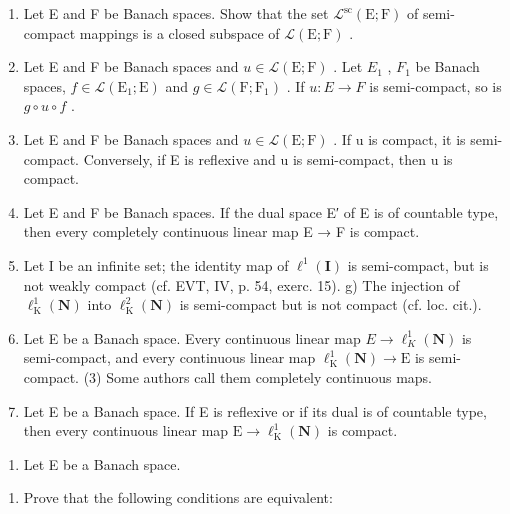 \begin{enumerate}
\def\labelenumi{\alph{enumi})}
\setcounter{enumi}{1}
\item
  Let E and F be Banach spaces. Show that the set \(\mathcal{L}^{\mathrm{sc}}(\mathrm{E};\mathrm{F})\) of semi-compact mappings is a closed subspace of \(\mathcal{L}(\mathrm{E};\mathrm{F})\) .
\item
  Let E and F be Banach spaces and \(u \in \mathcal{L}(\mathrm{E};\mathrm{F})\) . Let \(E_{1}\) , \(F_{1}\) be Banach spaces, \(f \in \mathcal{L}(\mathrm{E}_{1};\mathrm{E})\) and \(g \in \mathcal{L}(\mathrm{F};\mathrm{F}_{1})\) . If \(u: E \to F\) is semi-compact, so is \(g \circ u \circ f\) .
\item
  Let E and F be Banach spaces and \(u \in \mathcal{L}(\mathrm{E};\mathrm{F})\) . If u is compact, it is semi-compact. Conversely, if E is reflexive and u is semi-compact, then u is compact.
\item
  Let E and F be Banach spaces. If the dual space E′ of E is of countable type, then every completely continuous linear map E → F is compact.
\item
  Let I be an infinite set; the identity map of \(\ell^{1}(\mathbf{I})\) is semi-compact, but is not weakly compact (cf. EVT, IV, p. 54, exerc. 15). g) The injection of \(\ell_{\mathrm{K}}^{1}(\mathbf{N})\) into \(\ell_{\mathrm{K}}^{2}(\mathbf{N})\) is semi-compact but is not compact (cf. loc. cit.).
\item
  Let E be a Banach space. Every continuous linear map \(E \rightarrow \ell_{K}^{1}(\mathbf{N})\) is semi-compact, and every continuous linear map \(\ell_{\mathrm{K}}^{1}(\mathbf{N}) \rightarrow \mathrm{E}\) is semi-compact.
(3) Some authors call them completely continuous maps.
\item
  Let E be a Banach space. If E is reflexive or if its dual is of countable type, then every continuous linear map \(\mathrm{E} \to \ell_{\mathrm{K}}^{1}(\mathbf{N})\) is compact.
\end{enumerate}

\begin{enumerate}
\def\labelenumi{\arabic{enumi})}
\setcounter{enumi}{30}
\tightlist
\item
  Let E be a Banach space.
\end{enumerate}

\begin{enumerate}
\def\labelenumi{\alph{enumi})}
\tightlist
\item
  Prove that the following conditions are equivalent:
\end{enumerate}

